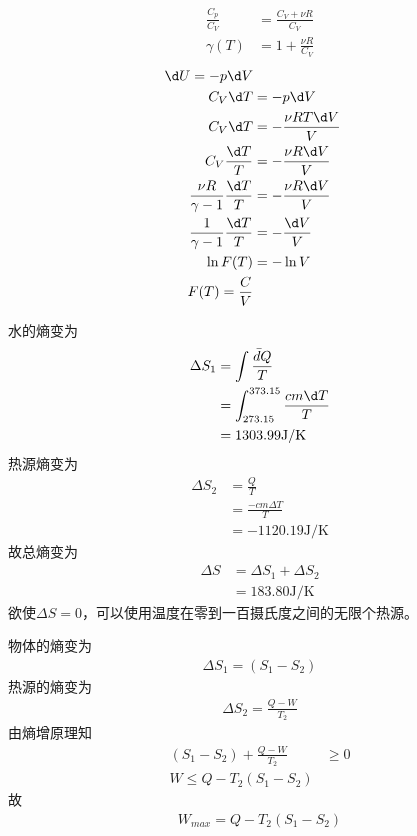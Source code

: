 \documentclass{phyasgn}
\begin{document}
\begin{sol}[4]
    \begin{align*}
        \frac{C_p}{C_V}&=\frac{C_V+\nu R}{C_V}\\
        \gamma(T)&=1+\frac{\nu R}{C_V}
    \end{align*}
    \begin{align*}
        \d U=-p\d V\\
        C_V\d T&=-p\d V\\
        C_V\d T&=-\frac{\nu R T\d V}{V}\\
        C_V\frac{\d T}{T}&=-\frac{\nu R\d V}{V}\\
        \frac{\nu R}{\gamma-1}\frac{\d T}{T}&=-\frac{\nu R\d V}{V}\\
        \frac{1}{\gamma-1}\frac{\d T}{T}&=-\frac{\d V}{V}\\
        \ln F(T)&=-\ln V\\
        F(T)=\frac{C}{V}
    \end{align*}
\end{sol}\par

\begin{sol}[5]
    水的熵变为
    \begin{align*}
        \Delta S_1&=\int\frac{\bar{d}Q}{T}\\
        &=\int_{273.15}^{373.15}\frac{cm\d T}{T}\\
        &=1303.99\text{J/K}
    \end{align*}
    热源熵变为
    \begin{align*}
        \Delta S_2&=\frac{Q}{T}\\
        &=\frac{-cm\Delta T}{T}\\
        &=-1120.19\text{J/K}
    \end{align*}
    故总熵变为
    \begin{align*}
        \Delta S&=\Delta S_1+\Delta S_2\\
        &=183.80\text{J/K}
    \end{align*}
    欲使$\Delta S=0$，可以使用温度在零到一百摄氏度之间的无限个热源。
\end{sol}\par

\begin{sol}[6]
    物体的熵变为
    \begin{align*}
        \Delta S_1=(S_1-S_2)
    \end{align*}
    热源的熵变为
    \begin{align*}
        \Delta S_2=\frac{Q-W}{T_2}
    \end{align*}
    由熵增原理知
    \begin{align*}
        (S_1-S_2)+\frac{Q-W}{T_2}&\geq 0\\
        W\leq Q-T_2(S_1-S_2)
    \end{align*}
    故
    \begin{align*}
        W_{max}=Q-T_2(S_1-S_2)
    \end{align*}
\end{sol}\par
\end{document}
